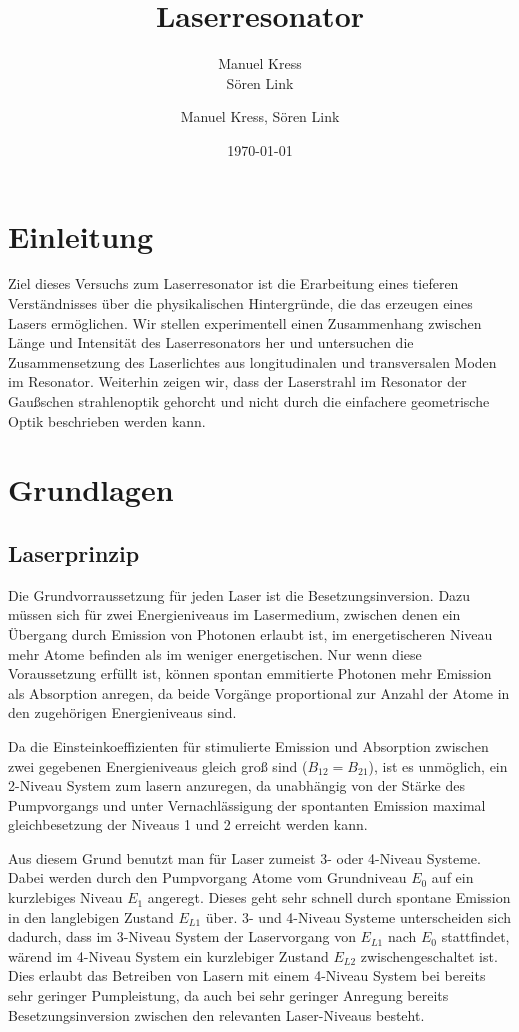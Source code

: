 \documentclass[bigchapter,colorback,accentcolor=tud4b,linedtoc,11pt]{tudreport}
\title{Laserresonator}
\subtitle{Manuel Kress  \\Sören Link}
\author{Manuel Kress, Sören Link}
\date{\today}
\numberwithin{equation}{subsection}
\begin{document}

\maketitle

\tableofcontents


\chapter{Einleitung}
Ziel dieses Versuchs zum Laserresonator ist die Erarbeitung eines tieferen Verständnisses über die physikalischen Hintergründe, die das erzeugen eines Lasers ermöglichen.
Wir stellen experimentell einen Zusammenhang zwischen Länge und Intensität des Laserresonators her und untersuchen die Zusammensetzung des Laserlichtes aus longitudinalen und transversalen Moden im Resonator. Weiterhin zeigen wir, dass der Laserstrahl im Resonator der Gaußschen strahlenoptik gehorcht und nicht durch die einfachere geometrische Optik beschrieben werden kann.
\chapter{Grundlagen}
\section{Laserprinzip}
Die Grundvorraussetzung für jeden Laser ist die Besetzungsinversion. Dazu müssen sich für zwei Energieniveaus im Lasermedium, zwischen denen ein Übergang durch Emission von Photonen erlaubt ist, im energetischeren Niveau mehr Atome befinden als im weniger energetischen. Nur wenn diese Voraussetzung erfüllt ist, können spontan emmitierte Photonen mehr Emission als Absorption anregen, da beide Vorgänge proportional zur Anzahl der Atome in den zugehörigen Energieniveaus sind.

Da die Einsteinkoeffizienten für stimulierte Emission und Absorption zwischen zwei gegebenen Energieniveaus gleich groß sind ($B_{12}=B_{21}$), ist es unmöglich, ein 2-Niveau System zum lasern anzuregen, da unabhängig von der Stärke des Pumpvorgangs und unter Vernachlässigung der spontanten Emission maximal gleichbesetzung der Niveaus 1 und 2 erreicht werden kann.

Aus diesem Grund benutzt man für Laser zumeist 3- oder 4-Niveau Systeme. Dabei werden durch den Pumpvorgang Atome vom Grundniveau $E_0$ auf ein kurzlebiges Niveau $E_1$ angeregt. Dieses geht sehr schnell durch spontane Emission in den langlebigen Zustand $E_{L1}$ über. 3- und 4-Niveau Systeme unterscheiden sich dadurch, dass im 3-Niveau System der Laservorgang von $E_{L1}$ nach $E_{0}$ stattfindet, wärend im 4-Niveau System ein kurzlebiger Zustand $E_{L2}$ zwischengeschaltet ist. Dies erlaubt das Betreiben von Lasern mit einem 4-Niveau System bei bereits sehr geringer Pumpleistung, da auch bei sehr geringer Anregung bereits Besetzungsinversion zwischen den relevanten Laser-Niveaus besteht.
\end{document}
